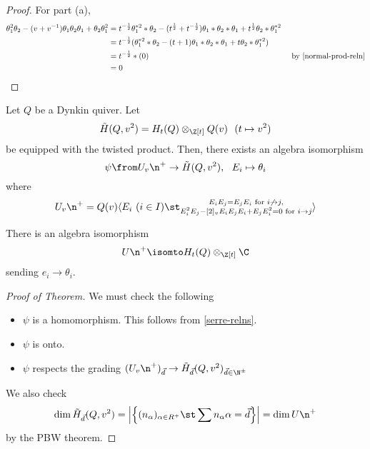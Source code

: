\documentclass[11pt,leqno,oneside]{amsbook}
\numberwithin{thm}{section}
\renewcommand{\Q}{Q} %
\newcommand{\roots}{R} %
\newcommand{\U}{U}
\begin{document}
  \begin{proof}
    For part (a),
    \begin{align*}
      \theta_1^2 \theta_2 - (v+v^{-1})\theta_1 \theta_2 \theta_1
      + \theta_2 \theta_1^2
      & = t^{-\frac{1}{2}} \theta_1^{*2} *
        \theta_2 - (t^{\frac{1}{2}} + t^{-\frac{1}{2}}) \theta_1 *
        \theta_2 * \theta_1 + t^{\frac{1}{2}} \theta_2 * \theta_1^{*2}
      \\
      & = t^{-\frac{1}{2}} (\theta_1^{*2} *
        \theta_2 - (t + 1) \theta_1 *
        \theta_2 * \theta_1 + t \theta_2 * \theta_1^{*2}) \\
      & = t^{-\frac{1}{2}} * (0) & \text{ by \ref{normal-prod-reln}}
      \\
      & = 0
    \end{align*}
  \end{proof}
  \begin{thm}
    Let \(\Q\) be a Dynkin quiver. Let \[
      \tilde{H}(\Q, v^2) = H_t(\Q) \otimes_{\Z[t]} \Q(v) \ \ (t
      \mapsto v^2)
    \]
    be equipped with the twisted product. Then, there exists an
    algebra isomorphism \[
      \psi \from \U_v \n^+ \to \tilde{H}(\Q, v^2), \ \ E_i \mapsto \theta_i
    \]
    where \[
      \U_v \n^+ = \Q(v) \langle E_i \ (i \in I) \st \substack{E_i E_j = E_j E_i
      \text{ for } i \not\to j, \\ E_i^2 E_j - [2]_v E_i E_j E_i + E_j
      E_i^2 = 0 \text{ for } i \to j} \rangle
    \]
  \end{thm}
  \begin{cor}
    There is an algebra isomorphism \[
      U \n^+ \isomto H_t(\Q) \otimes_{\Z[t]} \C
    \]
    sending \(e_i \to \theta_i\).
  \end{cor}
  \begin{proof}[Proof of Theorem]
    We must check the following
    \begin{itemize}
    \item \(\psi\) is a homomorphism. This follows from
      \ref{serre-relns}.
    \item \(\psi\) is onto.
    \item \(\psi\) respects the grading \((\U_v \n^+)_{\vec{d}} \to
      \tilde{H}_{\vec{d}} (\Q,v^2)_{\vec{d} \in \N^\pm}\)
    \end{itemize}
    We also check \[
      \dim \tilde{H}_{\vec{d}} (\Q, v^2) = \left| \left\{
          (n_\alpha)_{\alpha \in \roots^+} \st \sum n_\alpha \alpha =
          \vec{d} \right\} \right| = \dim \U \n^+
    \]
    by the PBW theorem.
  \end{proof}
\end{document}
